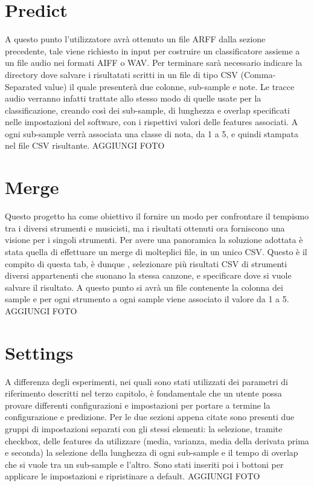 \section{Predict}
A questo punto l'utilizzatore avrà ottenuto un file ARFF dalla sezione precedente, tale viene richiesto in input per costruire un classificatore assieme a un file audio nei formati AIFF o WAV. Per terminare sarà necessario indicare la directory dove salvare i risultatati scritti in un file di tipo CSV (Comma-Separated value) il quale presenterà due colonne, sub-sample e note. Le tracce audio verranno infatti trattate allo stesso modo di quelle usate per la classificazione, creando così dei sub-sample, di lunghezza e overlap specificati nelle impostazioni del software, con i rispettivi valori delle features associati. A ogni sub-sample verrà associata una classe di nota, da 1 a 5, e quindi stampata nel file CSV risultante.
AGGIUNGI FOTO

\section{Merge}
Questo progetto ha come obiettivo il fornire un modo per confrontare il tempismo tra i diversi strumenti e musicisti, ma i risultati ottenuti ora forniscono una visione per i singoli strumenti. Per avere una panoramica la soluzione adottata è stata quella di effettuare un merge di molteplici file, in un unico CSV. Questo è il compito di questa tab, è dunque , selezionare più risultati CSV di strumenti diversi appartenenti che suonano la stessa canzone, e specificare dove si vuole salvare il risultato. A questo punto si avrà un file contenente la colonna dei sample e per ogni strumento a ogni sample viene associato il valore da 1 a 5.
AGGIUNGI FOTO


\section{Settings}
A differenza degli esperimenti, nei quali sono stati utilizzati dei parametri di riferimento descritti nel terzo capitolo, è fondamentale che un utente possa provare differenti configurazioni e impostazioni per portare a termine la configurazione e predizione. Per le due sezioni appena citate sono presenti due gruppi di impostazioni separati con gli stessi elementi: la selezione, tramite checkbox, delle features da utilizzare (media, varianza, media della derivata prima e seconda) la selezione della lunghezza di ogni sub-sample e il tempo di overlap che si vuole tra un sub-sample e l'altro. Sono stati inseriti poi i bottoni per applicare le impostazioni e ripristinare a default.
AGGIUNGI FOTO